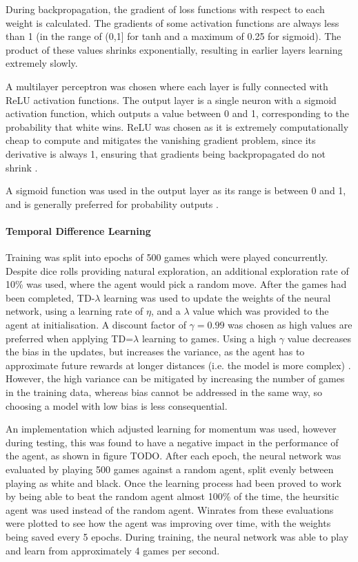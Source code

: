 \begin{definition}
During backpropagation, the gradient of loss functions with respect to each weight is calculated. The gradients of some activation functions are always less than 1 (in the range of (0,1] for tanh and a maximum of 0.25 for sigmoid). The product of these values shrinks exponentially, resulting in earlier layers learning extremely slowly.   
\end{definition}

A multilayer perceptron was chosen where each layer is fully connected with ReLU activation functions. The output layer is a single neuron with a sigmoid activation function, which outputs a value between 0 and 1, corresponding to the probability that white wins. ReLU was chosen as it is extremely computationally cheap to compute and mitigates the vanishing gradient problem, since its derivative is always 1, ensuring that gradients being backpropagated do not shrink \cite{reluvanish}.

A sigmoid function was used in the output layer as its range is between 0 and 1, and is generally preferred for probability outputs \cite{LeCun2012}. 

\paragraph{Temporal Difference Learning}
Training was split into epochs of 500 games which were played concurrently. Despite dice rolls providing natural exploration, an additional exploration rate of 10\% was used, where the agent would pick a random move. 
After the games had been completed, TD-$\lambda$ learning was used to update the weights of the neural network, using a learning rate of $\eta$, and a $\lambda$ value which was provided to the agent at initialisation. A discount factor of $\gamma = 0.99$ was chosen as high values are preferred when applying TD=$\lambda$ learning to games. Using a high $\gamma$ value decreases the bias in the updates, but increases the variance, as the agent has to approximate future rewards at longer distances (i.e. the model is more complex) \cite{BRISCOE20112}. However, the high variance can be mitigated by increasing the number of games in the training data, whereas bias cannot be addressed in the same way, so choosing a model with low bias is less consequential.


An implementation which adjusted learning for momentum was used, however during testing, this was found to have a negative impact in the performance of the agent, as shown in figure TODO.
After each epoch, the neural network was evaluated by playing 500 games against a random agent, split evenly between playing as white and black. 
Once the learning process had been proved to work by being able to beat the random agent almost 100\% of the time, the heursitic agent was used instead of the random agent. Winrates from these evaluations were plotted to see how the agent was improving over time, with the weights being saved every 5 epochs. During training, the neural network was able to play and learn from approximately 4 games per second.

